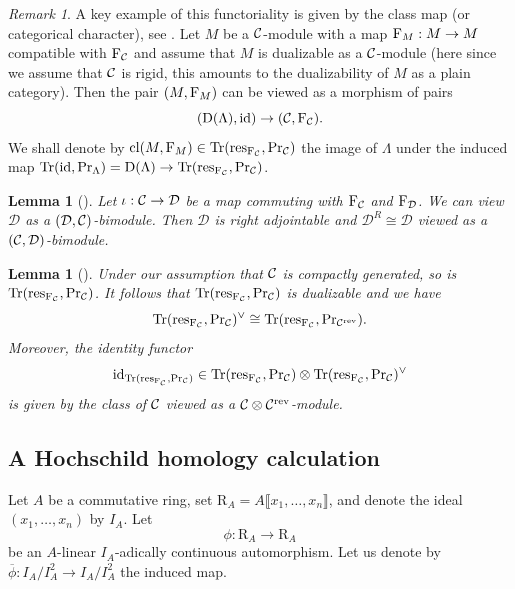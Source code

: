 \documentclass[a4paper, 10pt, oneside, reqno]{amsart}
\theoremstyle{plain}
\newtheorem{lem}[thm]{Lemma}
\theoremstyle{definition}
\theoremstyle{remark}
\newtheorem{rque}[thm]{Remark}
\newcommand{\RR}{\mathrm{R}}
\newcommand{\Prr}{\mathrm{Pr}}
\newcommand{\restr}{\mathrm{res}}
\newcommand{\Dcal}{\mathcal{D}}
\begin{document}
\begin{rque}\label{rque:class-map}
A key example of this functoriality is given by the class map (or categorical character), see \cite[Section 3.8.1]{ToyModel}. Let $M$ be a $\mathcal{C}$-module with a map $\mathrm{F}_{M} : M \to M$ compatible with $\mathrm{F}_{\mathcal{C}}$ and assume that $M$ is dualizable as a $\mathcal{C}$-module (here since we assume that $\mathcal{C}$ is rigid, this amounts to the dualizability of $M$ as a plain category). Then the pair $(M, \mathrm{F}_M)$ can be viewed as a morphism of pairs 
$$(\mathrm{D}(\Lambda), \mathrm{id}) \to (\mathcal{C}, \mathrm{F}_{\mathcal{C}}).$$
We shall denote by $\cl(M, \Frob_{M}) \in \Tr(\restr_{\Frob_{\Ccal}}, \Prr_{\Ccal})$ the image of $\Lambda$ under the induced map $\Tr(\id,\Prr_{\Lambda}) = \DD(\Lambda) \to \Tr(\restr_{\Frob_{\Ccal}}, \Prr_{\Ccal})$. 
\end{rque} 

\begin{lem}[]\label{lem:right-adjoint-to-induction}
Let $\iota : \Ccal \to \Dcal$ be a map commuting with $\mathrm{F}_{\mathcal{C}}$ and $\Frob_{\Dcal}$. We can view $\Dcal$ as a $(\Dcal, \Ccal)$-bimodule. Then $\Dcal$ is right adjointable and $\Dcal^R \cong \Dcal$ viewed as a $(\Ccal, \Dcal)$-bimodule. 
\end{lem}

\begin{lem}[]\label{lem:dual-of-categorical-trace}
Under our assumption that $\mathcal{C}$ is compactly generated, so is $\Tr(\restr_{\Frob_{\Ccal}}, \Prr_{\Ccal})$. It follows that $\Tr(\restr_{\Frob_{\Ccal}}, \Prr_{\Ccal})$ is dualizable and we have 
$$\Tr(\restr_{\Frob_{\Ccal}}, \Prr_{\Ccal})^{\vee} \cong \Tr(\restr_{\Frob_{\Ccal}}, \Prr_{\Ccal^{\rev}}).$$
Moreover, the identity functor 
$$\id_{\Tr(\restr_{\Frob_{\Ccal}}, \Prr_{\Ccal})} \in \Tr(\restr_{\Frob_{\Ccal}}, \Prr_{\Ccal}) \otimes \Tr(\restr_{\Frob_{\Ccal}}, \Prr_{\Ccal})^{\vee}$$
is given by the class of $\mathcal{C}$ viewed as a $\mathcal{C} \otimes \mathcal{C}^{\mathrm{rev}}$-module.
\end{lem}



\subsection{A Hochschild homology calculation}\label{ssec:HHcalculation}

Let $A$ be a commutative ring, set $\RR_A = A\llbracket x_1, \dots, x_n\rrbracket$, and denote the ideal $(x_1,\dots, x_n)$ by $I_A$. Let
$$\phi : \RR_A \to \RR_A$$
be an $A$-linear $I_A$-adically continuous automorphism. Let us denote by $\overline{\phi} : I_A/I_A^2 \to I_A/I_A^2$ the induced map. 
\end{document}
